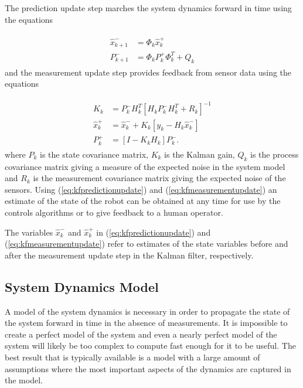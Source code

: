 The prediction update step marches the system dynamics forward in time using the equations

\begin{align}
\label{eq:kfpredictionupdate}
\begin{split}
\hat{x}_{k+1}^- &= \Phi_k\hat{x}_k^+ \\
P_{k+1}^- &= \Phi_kP_k^+\Phi_k^T + Q_k
\end{split}
\end{align}
and the measurement update step provides feedback from sensor data using the equations

\begin{align}
\label{eq:kfmeasurementupdate}
\begin{split}
K_k &= P_k^-H_k^T\left[H_kP_k^-H_k^T + R_k\right]^{-1} \\
\hat{x}_k^+ &= \hat{x}_k^- + K_k\left[y_k - H_k\hat{x}_k^-\right] \\
P_k^+ &= \left[I - K_kH_k\right]P_k^-.
\end{split}
\end{align}
where $P_k$ is the state covariance matrix, $K_k$ is the Kalman gain, $Q_k$ is the process covariance matrix giving a measure of the expected noise in the system model and $R_k$ is the measurement covariance matrix giving the expected noise of the sensors. Using (\ref{eq:kfpredictionupdate}) and (\ref{eq:kfmeasurementupdate}) an estimate of the state of the robot can be obtained at any time for use by the controls algorithms or to give feedback to a human operator.

The variables $\hat{x}_k^-$ and $\hat{x}_k^+$ in (\ref{eq:kfpredictionupdate}) and (\ref{eq:kfmeasurementupdate}) refer to estimates of the state variables before and after the measurement update step in the Kalman filter, respectively.

\subsection{System Dynamics Model}
\label{sec:dynamics}
A model of the system dynamics is necessary in order to propagate the state of the system forward in time in the absence of measurements. It is impossible to create a perfect model of the system and even a nearly perfect model of the system will likely be too complex to compute fast enough for it to be useful. The best result that is typically available is a model with a large amount of assumptions where the most important aspects of the dynamics are captured in the model.

